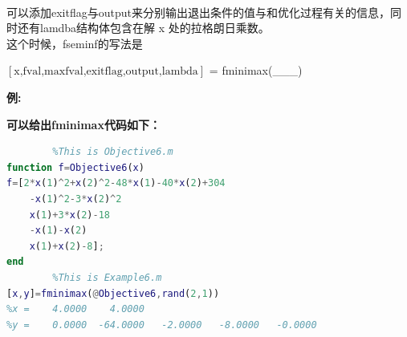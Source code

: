 \documentclass[a4paper,20pt]{article}
\begin{document}
\\可以添加exitflag与output来分别输出退出条件的值与和优化过程有关的信息，同时还有lamdba结构体包含在解 x 处的拉格朗日乘数。
\\这个时候，fseminf的写法是
\begin{center}
    $\left[\text{x,fval,maxfval,exitflag,output,lambda}\right]$ = fminimax(\_\_\_)
\end{center}
\par \textbf{例:}
\par \noindent {}
\par \noindent \textbf{可以给出fminimax代码如下：}
\begin{center}
    \begin{lstlisting}[caption={fminimax},language=Matlab]
% NonLinear Programming
        %This is Objective6.m
function f=Objective6(x)
f=[2*x(1)^2+x(2)^2-48*x(1)-40*x(2)+304
    -x(1)^2-3*x(2)^2
    x(1)+3*x(2)-18
    -x(1)-x(2)
    x(1)+x(2)-8];
end
        %This is Example6.m
[x,y]=fminimax(@Objective6,rand(2,1))
%x =    4.0000    4.0000
%y =    0.0000  -64.0000   -2.0000   -8.0000   -0.0000
            \end{lstlisting}
\end{center}
\end{document}
